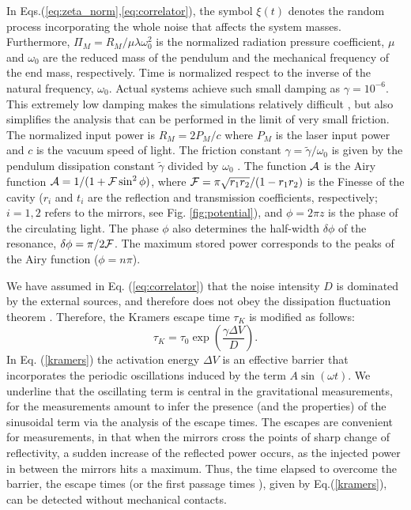 \documentclass[conference]{IEEEtran}
\newcommand{\beq}{\begin{equation}}
\newcommand{\eeq}{\end{equation}}
\begin{document}
\noindent 
In Eqs.(\ref{eq:zeta_norm},\ref{eq:correlator}), the symbol $\xi(t)$ denotes  the random process incorporating the whole noise that affects the system masses.
Furthermore,  $\Pi_{M} = R_{M}/\mu \lambda \omega_0^2$ is the normalized radiation pressure coefficient, $\mu$ and $\omega_0$ are the reduced mass of the pendulum and the mechanical frequency of the end mass, respectively. 
Time is normalized respect to the inverse of the natural frequency, $\omega_0$.
Actual systems achieve such small damping as $\gamma = 10^{-6}$\cite{Drever83}.
This extremely low damping makes the simulations relatively difficult \cite{Sivak13}, but also simplifies the analysis that can be performed in the limit of very small friction\cite{Mannella04}. The normalized input power is $R_{M}= 2 P_{M}/c$ where $P_M$ is the laser input power and $c$ is the vacuum speed of light.
The friction constant $\gamma=\tilde{\gamma}/\omega_0$ is given by the pendulum dissipation constant $\tilde{\gamma}$ divided by $\omega_0$ . 
The function ${\cal A}$ is the Airy function ${\cal A} =1/(1+{\cal F} \sin^2{\phi})$, where 
${\cal F}=\pi\sqrt{r_1 r_2}/(1-r_1r_2)$ is the Finesse of the cavity ($r_{i}$ and $t_i$ are the reflection and transmission coefficients, respectively; $i=1,2$ refers to the mirrors, see Fig. \ref{fig:potential}), and  $\phi=2\pi z$ is the phase of the circulating light.
The phase $\phi$ also determines the half-width $\delta \phi$ of the resonance, $\delta \phi = \pi/2 {\cal F}$. 
The maximum stored power corresponds to the peaks of the Airy function ($\phi=n\pi$). 


We have assumed in Eq. (\ref{eq:correlator}) that the noise intensity $D$ is dominated by the external sources, and therefore does not obey the dissipation fluctuation theorem \cite{Risken89}. Therefore, the Kramers escape time $\tau_K$ \cite{Kramers40} is modified as follows:
\beq
 \tau_K  = \tau_0 \exp\left( \frac{\gamma \Delta V}{D}\right).
\label{kramers}
\eeq
In Eq. (\ref{kramers}) the activation energy $\Delta V$ is an effective barrier that incorporates the periodic oscillations induced by the term $A \sin \left( \omega t \right)$. 
We underline that the oscillating term is central  in the gravitational measurements, for the measurements amount to infer the presence (and the properties) of the sinusoidal term via the analysis of the escape times.
The escapes are convenient for measurements, in that when the mirrors cross the points of sharp change of reflectivity, a sudden increase of the reflected power occurs, as the injected power in between the mirrors hits a maximum.
Thus, the time elapsed to overcome the barrier, the escape times (or the first passage times \cite{Risken89}), given by Eq.(\ref{kramers}), can be detected without mechanical contacts. 
\end{document}
